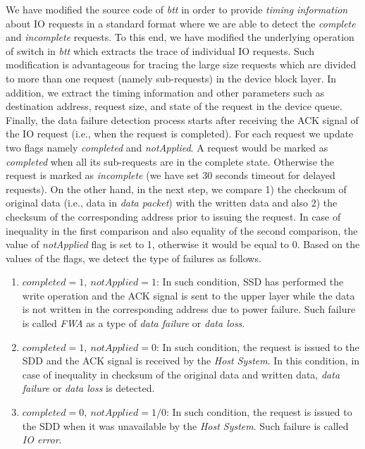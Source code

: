 We have modified the source code of \emph{btt} in order to provide \emph{timing information} about IO requests in a standard format where we are able to detect the \emph{complete} and \emph{incomplete} requests. To this end, we have modified the underlying operation of  switch in \emph{btt} which extracts the trace of individual IO requests. Such modification is advantageous for tracing the large size requests which are divided to more than one request (namely sub-requests) in the device block layer. In addition, we extract the timing information and other parameters such as destination address, request size, and state of the request in the device queue. 
Finally, the data failure detection process starts after receiving the ACK signal of the IO request (i.e., when the request is completed). 
For each request we update two flags namely \emph{completed} and \emph{notApplied}. A request would be marked as \emph{completed} when all its sub-requests are in the complete state. Otherwise the request is marked as \emph{incomplete} (we have set 30 seconds timeout for delayed requests). On the other hand, in the next step, we compare 1) the checksum of original data (i.e., data in \emph{data packet}) with the written data  and also 2) the checksum of the corresponding address prior to issuing the request. In case of inequality in the first comparison and also equality of the second comparison, the value of \emph{notApplied} flag is set to 1, otherwise it would be equal to 0. Based on the values of the flags, we detect the type of failures as follows.
\begin{enumerate}
	\item $completed=1,~notApplied=1$: In such condition, SSD has performed the write operation and the ACK signal is sent to the upper layer while the data is not written in the corresponding address due to power failure. Such failure is called \emph{FWA} as a type of \emph{data failure} or \emph{data loss}. 
	\item $completed=1,~notApplied=0$: In such condition, the request is issued to the SDD and the ACK signal is received by the \emph{Host System}. In this condition, in case of inequality in checksum of the original data and written data, \emph{data failure} or \emph{data loss} is detected. 
	\item $completed=0,~notApplied=1/0$: In such condition, the request is issued to the SDD when it was unavailable by the \emph{Host System}. Such failure is called \emph{IO error}.
\end{enumerate}

